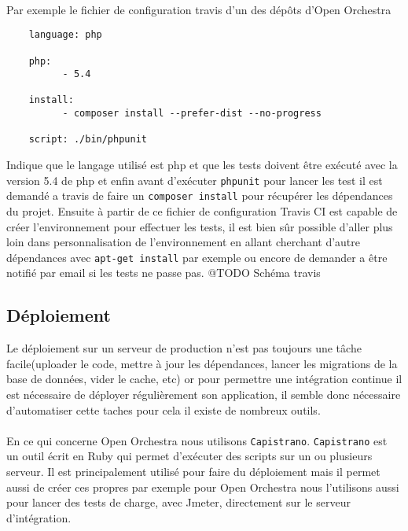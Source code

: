 \paragraph{}
Par exemple le fichier de configuration travis d'un des dépôts d'Open Orchestra 
\begin{verbatim}
    language: php

    php:
          - 5.4

    install:
          - composer install --prefer-dist --no-progress
 
    script: ./bin/phpunit
\end{verbatim}

Indique que le langage utilisé est php et que les tests doivent être exécuté avec la version 5.4 de php et enfin avant d'exécuter \verb?phpunit? pour lancer les test il est demandé a travis de faire un \verb?composer install? pour récupérer les dépendances du projet.  Ensuite à partir de ce fichier de configuration Travis CI est capable de créer l'environnement pour effectuer les tests, il est bien sûr possible d'aller plus loin dans  personnalisation de l'environnement en allant cherchant d'autre dépendances avec \verb?apt-get install? par exemple ou encore de demander a être notifié par email si les tests ne passe pas.
@TODO Schéma travis
\subsection{Déploiement}
Le déploiement sur un serveur de production n'est pas toujours une tâche facile(uploader le code, mettre à jour les dépendances, lancer les migrations de la base de données, vider le cache, etc)  or pour permettre une intégration continue il est nécessaire de déployer régulièrement son application, il semble donc nécessaire d'automatiser cette taches pour cela il existe de nombreux outils. 
\paragraph{}
En ce qui concerne Open Orchestra nous utilisons \verb?Capistrano?. \verb?Capistrano? est un outil écrit en Ruby qui permet d'exécuter des scripts sur un ou plusieurs serveur. Il est principalement utilisé pour faire du déploiement mais il permet aussi de créer ces propres par exemple pour Open Orchestra nous l'utilisons aussi pour lancer des tests de charge, avec Jmeter, directement sur le serveur d'intégration.

